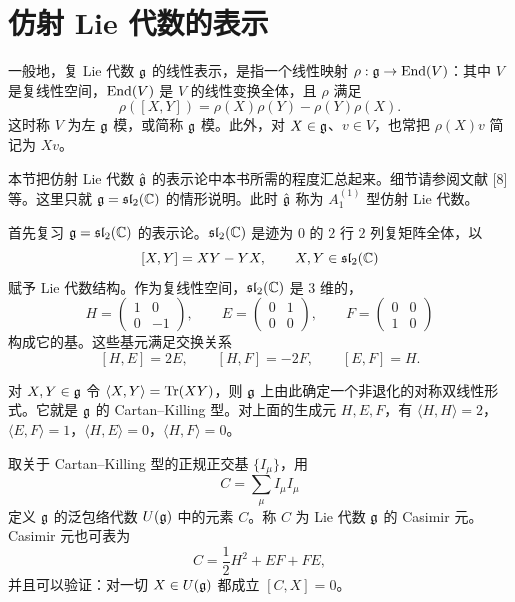
\section{仿射 Lie 代数的表示}


一般地，复 Lie 代数 $\mathfrak{g}$ 的线性表示，是指一个线性映射 $\rho:\mathfrak{g}\to\operatorname{End}(V)$：其中 $V$ 是复线性空间，$\operatorname{End}(V)$ 是 $V$ 的线性变换全体，且 $\rho$ 满足
\[
  \rho([X,Y])=\rho(X)\rho(Y)-\rho(Y)\rho(X).
\]
这时称 $V$ 为左 $\mathfrak{g}$ 模，或简称 $\mathfrak{g}$ 模。此外，对 $X\in\mathfrak{g}$、$v\in V$，也常把 $\rho(X)v$ 简记为 $Xv$。

本节把仿射 Lie 代数 $\hat{\mathfrak{g}}$ 的表示论中本书所需的程度汇总起来。细节请参阅文献 [8] 等。这里只就 $\mathfrak{g}=\mathfrak{sl}_2(\mathbb{C})$ 的情形说明。此时 $\hat{\mathfrak{g}}$ 称为 $A_1^{(1)}$ 型仿射 Lie 代数。

首先复习 $\mathfrak{g}=\mathfrak{sl}_2(\mathbb{C})$ 的表示论。$\mathfrak{sl}_2(\mathbb{C})$ 是迹为 $0$ 的 $2$ 行 $2$ 列复矩阵全体，以
\[
  [X,Y]=XY-YX,\qquad X,Y\in\mathfrak{sl}_2(\mathbb{C})
\]
赋予 Lie 代数结构。作为复线性空间，$\mathfrak{sl}_2(\mathbb{C})$ 是 $3$ 维的，
\[
  H=\begin{pmatrix}1&0\\0&-1\end{pmatrix},\qquad
  E=\begin{pmatrix}0&1\\0&0\end{pmatrix},\qquad
  F=\begin{pmatrix}0&0\\1&0\end{pmatrix}
\]
构成它的基。这些基元满足交换关系
\[
  [H,E]=2E,\qquad [H,F]=-2F,\qquad [E,F]=H.
\]

对 $X,Y\in\mathfrak{g}$ 令 $\langle X,Y\rangle=\operatorname{Tr}(XY)$，则 $\mathfrak{g}$ 上由此确定一个非退化的对称双线性形式。它就是 $\mathfrak{g}$ 的 Cartan--Killing 型。对上面的生成元 $H,E,F$，有 $\langle H,H\rangle=2$，$\langle E,F\rangle=1$，$\langle H,E\rangle=0$，$\langle H,F\rangle=0$。

取关于 Cartan--Killing 型的正规正交基 $\{I_\mu\}$，用
\[
  C=\sum_\mu I_\mu I_\mu
\]
定义 $\mathfrak{g}$ 的泛包络代数 $U(\mathfrak{g})$ 中的元素 $C$。称 $C$ 为 Lie 代数 $\mathfrak{g}$ 的 Casimir 元。Casimir 元也可表为
\[
  C=\frac{1}{2}H^2+EF+FE,
\]
并且可以验证：对一切 $X\in U(\mathfrak{g})$ 都成立 $[C,X]=0$。

